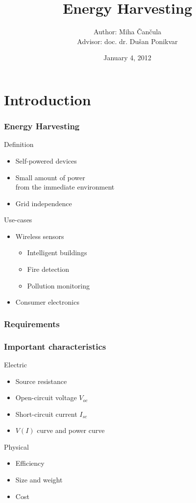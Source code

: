 \documentclass{beamer}
\title{Energy Harvesting}
\author{Author: Miha \v Can\v cula \\
  Advisor: doc. dr. Du\v san Ponikvar}
\institute{Faculty of Mathematics and Physics \\ University of Ljubljana}
\date{January 4, 2012}
\begin{document}
\frame{\titlepage}

\section{Introduction}

\begin{frame}
  \frametitle{Energy Harvesting}

\begin{block}{Definition}
  \begin{itemize}
    \item Self-powered devices
    \item Small amount of power \\ from the immediate environment
    \item Grid independence
  \end{itemize}
\end{block}

\begin{block}{Use-cases}
  \begin{itemize}
    \item Wireless sensors
    \begin{itemize}
      \item{Intelligent buildings}
      \item{Fire detection}
      \item{Pollution monitoring}
    \end{itemize}
    \item Consumer electronics
  \end{itemize}
\end{block}

\end{frame}

\begin{frame}
  \frametitle{Requirements}
\end{frame}

\begin{frame}
  \frametitle{Important characteristics}
\begin{block}{Electric}
\begin{itemize}
  \item Source resistance
  \item Open-circuit voltage $V_{oc}$
  \item Short-circuit current $I_{sc}$
  \item $V(I)$ curve and power curve
\end{itemize}
\end{block}

\begin{block}{Physical}
\begin{itemize}
  \item Efficiency
  \item Size and weight
  \item Cost
\end{itemize}
\end{block}

\end{frame}
\end{document}
